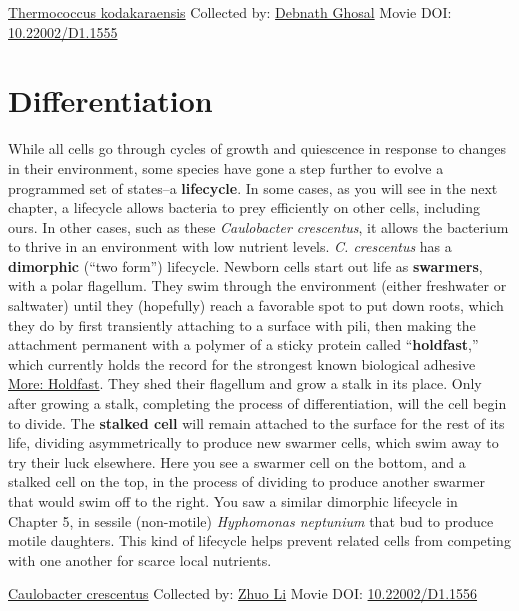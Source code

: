 \documentclass[]{tufte-book}
\begin{document}
\hypertarget{htmlwidget-caa7f1499a6a34e0303c}{}

\label{fig:8-3}\protect\hyperlink{tree}{Thermococcus kodakaraensis} Collected by: \protect\hyperlink{debnath_ghosal}{Debnath Ghosal} Movie DOI: \href{https://doi.org/10.22002/D1.1555}{10.22002/D1.1555}

\hypertarget{differentiation}{%
\section{Differentiation}\label{differentiation}}

While all cells go through cycles of growth and quiescence in response to changes in their environment, some species have gone a step further to evolve a programmed set of states--a \textbf{lifecycle}. In some cases, as you will see in the next chapter, a lifecycle allows bacteria to prey efficiently on other cells, including ours. In other cases, such as these \emph{Caulobacter crescentus}, it allows the bacterium to thrive in an environment with low nutrient levels. \emph{C. crescentus} has a \textbf{dimorphic} (``two form'') lifecycle. Newborn cells start out life as \textbf{swarmers}, with a polar flagellum. They swim through the environment (either freshwater or saltwater) until they (hopefully) reach a favorable spot to put down roots, which they do by first transiently attaching to a surface with pili, then making the attachment permanent with a polymer of a sticky protein called ``\textbf{holdfast},'' which currently holds the record for the strongest known biological adhesive \protect\hyperlink{Holdfast}{More: Holdfast}. They shed their flagellum and grow a stalk in its place. Only after growing a stalk, completing the process of differentiation, will the cell begin to divide. The \textbf{stalked cell} will remain attached to the surface for the rest of its life, dividing asymmetrically to produce new swarmer cells, which swim away to try their luck elsewhere. Here you see a swarmer cell on the bottom, and a stalked cell on the top, in the process of dividing to produce another swarmer that would swim off to the right. You saw a similar dimorphic lifecycle in Chapter 5, in sessile (non-motile) \emph{Hyphomonas neptunium} that bud to produce motile daughters. This kind of lifecycle helps prevent related cells from competing with one another for scarce local nutrients.



\hypertarget{htmlwidget-42b91ce486aa1959cf46}{}

\label{fig:8-4}\protect\hyperlink{tree}{Caulobacter crescentus} Collected by: \protect\hyperlink{zhuo_li}{Zhuo Li} Movie DOI: \href{https://doi.org/10.22002/D1.1556}{10.22002/D1.1556}
\end{document}
